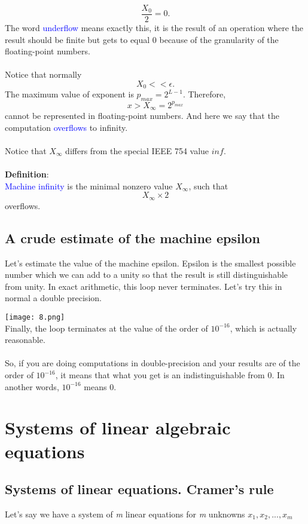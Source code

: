 \documentclass{article}
\begin{document}
\[
\frac{X_0}{2}=0.
\]
The word \textcolor{blue}{underflow} means exactly this, it is the result of an operation where the result should be finite but gets to equal 0 because of the granularity of the floating-point numbers.\\
\\Notice that normally
\[
X_0 << \epsilon .
\]
The maximum value of exponent is \(p_{max}=2^{L-1}\). Therefore,
\[
x>X_{\infty}=2^{p_{max}}
\]
cannot be represented in floating-point numbers. And here we say that the computation \textcolor{blue}{overflows} to infinity.\\
\\Notice that \(X_{\infty}\) differs from the special IEEE 754 value $inf$.\\
\\{\bf Definition}:\\
\textcolor{blue}{Machine infinity} is the minimal nonzero value \(X_{\infty}\), such that
\[
X_{\infty} \times 2
\]
overflows.

\subsection{A crude estimate of the machine epsilon}

Let's estimate the value of the machine epsilon. Epsilon is the smallest possible number which we can add to a unity so that the result is still distinguishable from unity. In exact arithmetic, this loop never terminates. Let's try this in normal a double precision.

\texttt{[image: 8.png]}\\
Finally, the loop terminates at the value of the order of \(10^{-16}\), which is actually reasonable.\\
\\So, if you are doing computations in double-precision and your results are of the order of \(10^{-16}\), it means that what you get is an indistinguishable from 0. In another words, \(10^{-16}\) means 0.

\section{Systems of linear algebraic equations}
\subsection{Systems of linear equations. Cramer's rule}

Let's say we have a system of {\it m} linear equations for {\it m} unknowns $x_1, x_2, ...,  x_m$
\end{document}
